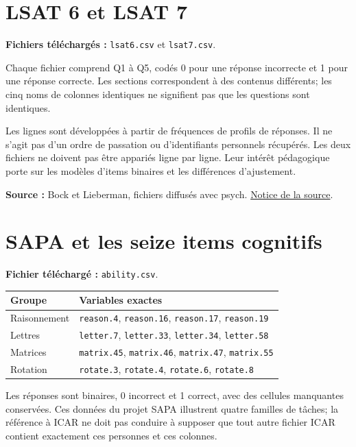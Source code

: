 \documentclass[
  french,
  11pt,
  a4paper,
  DIV=11,
  numbers=noendperiod]{scrreprt}
\newcounter{none} %
\begin{document}
\section{LSAT 6 et LSAT 7}\label{lsat-6-et-lsat-7}

\textbf{Fichiers téléchargés :} \texttt{lsat6.csv} et
\texttt{lsat7.csv}.

Chaque fichier comprend Q1 à Q5, codés 0 pour une réponse incorrecte et
1 pour une réponse correcte. Les sections correspondent à des contenus
différents; les cinq noms de colonnes identiques ne signifient pas que
les questions sont identiques.

Les lignes sont développées à partir de fréquences de profils de
réponses. Il ne s'agit pas d'un ordre de passation ou d'identifiants
personnels récupérés. Les deux fichiers ne doivent pas être appariés
ligne par ligne. Leur intérêt pédagogique porte sur les modèles d'items
binaires et les différences d'ajustement.

\textbf{Source :} Bock et Lieberman, fichiers diffusés avec psych.
\href{https://search.r-project.org/CRAN/refmans/psych/html/bock.table.html}{Notice
de la source}.

\section{SAPA et les seize items
cognitifs}\label{sapa-et-les-seize-items-cognitifs}

\textbf{Fichier téléchargé :} \texttt{ability.csv}.


{\def\LTcaptype{none} %
\begin{longtable}[]{@{}ll@{}}
\toprule\noalign{}
Groupe & Variables exactes \\
\midrule\noalign{}
\endhead
\bottomrule\noalign{}
\endlastfoot
Raisonnement & \texttt{reason.4}, \texttt{reason.16},
\texttt{reason.17}, \texttt{reason.19} \\
Lettres & \texttt{letter.7}, \texttt{letter.33}, \texttt{letter.34},
\texttt{letter.58} \\
Matrices & \texttt{matrix.45}, \texttt{matrix.46}, \texttt{matrix.47},
\texttt{matrix.55} \\
Rotation & \texttt{rotate.3}, \texttt{rotate.4}, \texttt{rotate.6},
\texttt{rotate.8} \\
\end{longtable}
}

Les réponses sont binaires, 0 incorrect et 1 correct, avec des cellules
manquantes conservées. Ces données du projet SAPA illustrent quatre
familles de tâches; la référence à ICAR ne doit pas conduire à supposer
que tout autre fichier ICAR contient exactement ces personnes et ces
colonnes.
\end{document}
